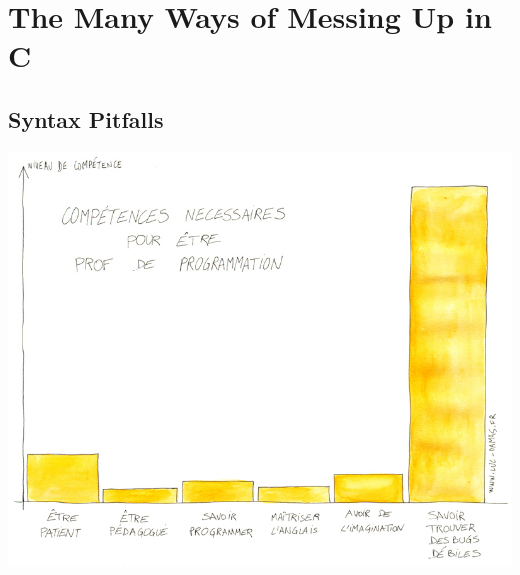 \section{The Many Ways of Messing Up in C}\subtoc
\subsection{Syntax Pitfalls}
\begin{frame}{}
  \thispagestyle{empty}
  \begin{center}
    \includegraphics[width=.9\linewidth]{img/competences-prof-programmation.jpg}
  \end{center}
\end{frame}

